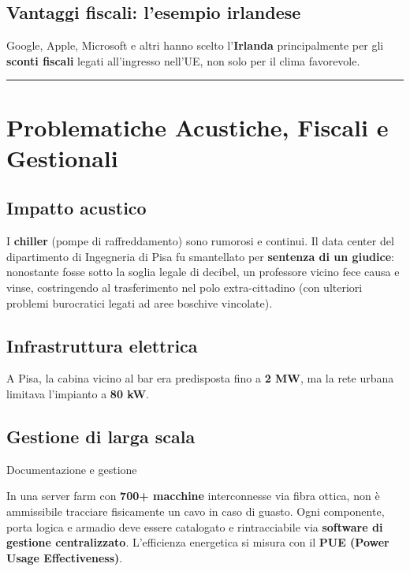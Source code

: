 \documentclass[
  italian,
  openany]{book}
\begin{document}
\subsection{Vantaggi fiscali: l'esempio
irlandese}\label{vantaggi-fiscali-lesempio-irlandese}

Google, Apple, Microsoft e altri hanno scelto l'\textbf{Irlanda}
principalmente per gli \textbf{sconti fiscali} legati all'ingresso
nell'UE, non solo per il clima favorevole.

\begin{center}\rule{0.5\linewidth}{0.5pt}\end{center}

\section{Problematiche Acustiche, Fiscali e
Gestionali}\label{problematiche-acustiche-fiscali-e-gestionali}

\subsection{Impatto acustico}\label{impatto-acustico}

I \textbf{chiller} (pompe di raffreddamento) sono rumorosi e continui.
Il data center del dipartimento di Ingegneria di Pisa fu smantellato per
\textbf{sentenza di un giudice}: nonostante fosse sotto la soglia legale
di decibel, un professore vicino fece causa e vinse, costringendo al
trasferimento nel polo extra-cittadino (con ulteriori problemi
burocratici legati ad aree boschive vincolate).

\subsection{Infrastruttura elettrica}\label{infrastruttura-elettrica}

A Pisa, la cabina vicino al bar era predisposta fino a \textbf{2 MW}, ma
la rete urbana limitava l'impianto a \textbf{80 kW}.

\subsection{Gestione di larga scala}\label{gestione-di-larga-scala}

\begin{calloutimportant}{Documentazione e gestione}

In una server farm con \textbf{700+ macchine} interconnesse via fibra
ottica, non è ammissibile tracciare fisicamente un cavo in caso di
guasto. Ogni componente, porta logica e armadio deve essere catalogato e
rintracciabile via \textbf{software di gestione centralizzato}.
L'efficienza energetica si misura con il \textbf{PUE (Power Usage
Effectiveness)}.

\end{calloutimportant}
\end{document}
